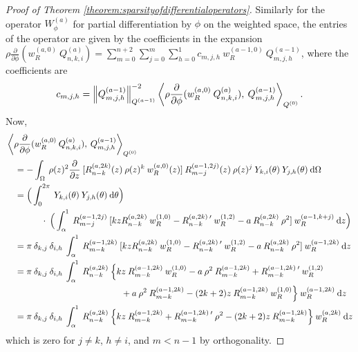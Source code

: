 \documentclass[11pt, oneside]{article}   	%
\newcommand{\genjac}{R}
\newcommand{\genjacnmk}{\genjac_{n-k}}
\newcommand{\genjacmmj}{\genjac_{m-j}}
\newcommand{\genjacw}{w_\genjac}
\newcommand{\scop}{Q}
\newcommand{\scopnki}{\scop_{n,k,i}}
\newcommand{\scopmjh}{\scop_{m,j,h}}
\newcommand{\scopnkia}{\scopnki^{(a)}}
\newcommand{\ch}{Y}
\newcommand{\chki}{\ch_{k,i}}
\newcommand{\chjh}{\ch_{j,h}}
\newcommand{\ppphi}{\frac{\partial}{\partial \phi}}
\newcommand{\ppz}{\frac{\partial}{\partial z}}
\newcommand{\rhoppphi}{\rho \ppphi}
\begin{document}
\begin{proof}[Proof of Theorem \ref{theorem:sparsityofdifferentialoperators}]
Similarly for the operator $W_\phi^{(a)}$ for partial differentiation by $\phi$ on the weighted space, the entries of the operator are given by the coefficients in the expansion $\rhoppphi (\genjacw^{(a,0)} \: \scopnkia) = \sum_{m=0}^{n+2} \sum_{j=0}^m \sum_{h=0}^1 c_{m,j,h} \: \genjacw^{(a-1,0)} \: \scopmjh^{(a-1)}$, where the coefficients are
\begin{align*}
	c_{m,j,h} = \norm{\scopmjh^{(a-1)}}^{-2}_{\scop^{(a-1)}} \ip<\rhoppphi (\genjacw^{(a,0)} \: \scopnkia), \: \scopmjh^{(a-1)}>_{\scop^{(0)}}.
\end{align*}
Now,
\begin{align*}
	&\ip<\rhoppphi (\genjacw^{(a,0)} \: \scopnkia), \: \scopmjh^{(a-1)}>_{\scop^{(0)}} \\
	&\quad = - \int_\Omega \: \rho(z)^2 \ppz \:  [\genjacnmk^{(a,2k)}(z) \: \rho(z)^k \: \genjacw^{(a, 0)}(z)] \: \genjacmmj^{(a-1,2j)}(z) \: \rho(z)^j \: \chki(\theta) \: \chjh(\theta) \: \D \Omega \\
	&\quad = \Big( \int_0^{2\pi} \: \chki(\theta) \: \chjh(\theta) \: \D \theta \Big) \\
	&\quad \quad \quad \quad \cdot \: \Big( \int_\alpha^1 \: \genjacmmj^{(a-1,2j)} \: [k z \genjacnmk^{(a, 2k)} \: \genjacw^{(1, 0)} - \genjacnmk^{(a, 2k) \: \prime} \: \genjacw^{(1, 2)} - a \: \genjacnmk^{(a, 2k)} \: \rho^2] \: \genjacw^{(a-1, k + j)} \: \D z \Big) \\
	&\quad = \pi \: \delta_{k,j} \: \delta_{i,h} \:  \int_\alpha^1 \: \genjac_{m-k}^{(a-1,2k)} \: [k z \genjacnmk^{(a, 2k)} \: \genjacw^{(1, 0)} - \genjacnmk^{(a, 2k) \: \prime} \: \genjacw^{(1, 2)} - a \: \genjacnmk^{(a, 2k)} \: \rho^2] \: \genjacw^{(a-1, 2k)} \: \D z \\
	&\quad = \pi \: \delta_{k,j} \: \delta_{i,h} \: \int_\alpha^1 \: \genjacnmk^{(a, 2k)} \: \Big\{  k z \: \genjac_{m-k}^{(a-1,2k)} \: \genjacw^{(1, 0)} - a \: \rho^2 \: \genjac_{m-k}^{(a-1,2k)} + \genjac_{m-k}^{(a-1,2k) \: \prime} \: \genjacw^{(1, 2)} \\
	&\quad \quad \quad \quad \quad \quad \quad \quad \quad \quad \quad \quad \quad + a \: \rho^2 \: \genjac_{m-k}^{(a-1,2k)} - (2k+2) z \: \genjac_{m-k}^{(a-1,2k)} \: \genjacw^{(1, 0)} \Big\} \: \genjacw^{(a-1, 2k)} \: \D z \\
	&\quad = \pi \: \delta_{k,j} \: \delta_{i,h} \: \int_\alpha^1 \: \genjacnmk^{(a, 2k)} \: \Big\{  k z \: \genjac_{m-k}^{(a-1,2k)} + \genjac_{m-k}^{(a-1,2k) \: \prime} \: \rho^2- (2k+2) z \: \genjac_{m-k}^{(a-1,2k)} \Big\} \: \genjacw^{(a, 2k)} \: \D z
\end{align*}
which is zero for $j \ne k$, $h \ne i$, and $m < n - 1$ by orthogonality.


\end{proof}
\end{document}
